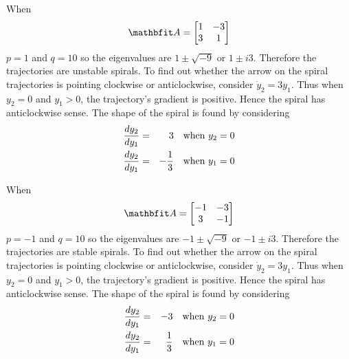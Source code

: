 \begin{example}
When 
$$\vect{A}=\begin{bmatrix} 1 & -3 \\ 3 & 1 \end{bmatrix}$$
$p=1$ and $q=10$ so
the eigenvalues are $1\pm\sqrt{-9}$ or $1\pm i3$.  Therefore the
trajectories are unstable spirals.  To find out whether the arrow on the
spiral trajectories is pointing clockwise or anticlockwise, consider
$\dot{y}_2=3y_1$.  Thus when $y_2=0$ and $y_1>0$, the trajectory's gradient
is positive.  Hence the spiral has anticlockwise sense.  The shape of the
spiral is found by considering
\begin{eqnarray*}
\frac{dy_2}{dy_1}&=&3\quad\mbox{when $y_2=0$}\\
\frac{dy_2}{dy_1}&=&-\frac{1}{3}\quad\mbox{when $y_1=0$}
\end{eqnarray*}

\begin{center}
\end{center}
\end{example}

\begin{example}
When
$$\vect{A}=\begin{bmatrix} -1 & -3 \\ 3 & -1 \end{bmatrix}$$
$p=-1$ and $q=10$ so
the eigenvalues are $-1\pm\sqrt{-9}$ or $-1\pm i3$.  Therefore the
trajectories are stable spirals.  To find out whether the arrow on the
spiral trajectories is pointing clockwise or anticlockwise, consider
$\dot{y}_2=3y_1$.  Thus when $y_2=0$ and $y_1>0$, the trajectory's gradient
is positive.  Hence the spiral has anticlockwise sense.  The shape of the
spiral is found by considering
\begin{eqnarray*}
\frac{dy_2}{dy_1}&=&-3\quad\mbox{when $y_2=0$}\\
\frac{dy_2}{dy_1}&=&\frac{1}{3}\quad\mbox{when $y_1=0$}
\end{eqnarray*}

\begin{center}
\end{center}
\end{example}

